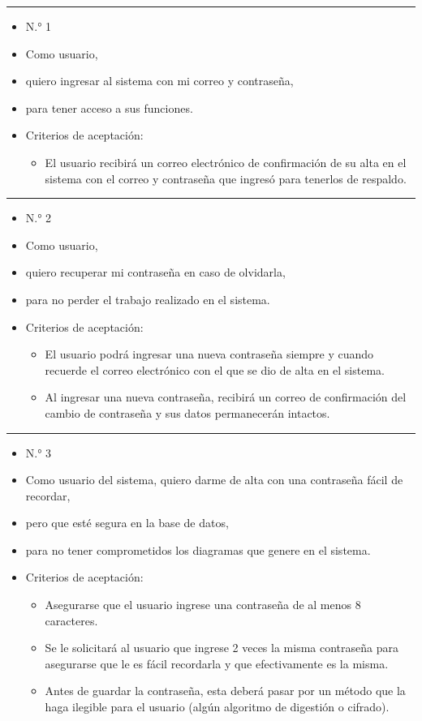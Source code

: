 \noindent\rule{\textwidth}{1pt}
\begin{itemize}
	\item N.° 1
	\item Como usuario,
	\item quiero ingresar al sistema con mi correo y contraseña,
	\item para tener acceso a sus funciones.
	\item Criterios de aceptación:
	\begin{itemize}
		\item El usuario recibirá un correo electrónico de confirmación de su alta en el sistema con el correo y contraseña que ingresó para tenerlos de respaldo.
	\end{itemize}
\end{itemize}
\noindent\rule{\textwidth}{1pt}
\begin{itemize}
	\item N.° 2
	\item Como usuario,
	\item quiero recuperar mi contraseña en caso de olvidarla,
	\item para no perder el trabajo realizado en el sistema.
	\item Criterios de aceptación:
	\begin{itemize}
		\item El usuario podrá ingresar una nueva contraseña siempre y cuando recuerde el correo electrónico con el que se dio de alta en el sistema.
		\item Al ingresar una nueva contraseña, recibirá un correo de confirmación del cambio de contraseña y sus datos permanecerán intactos.
	\end{itemize}
\end{itemize}
\noindent\rule{\textwidth}{1pt}
\begin{itemize}
	\item N.° 3
	\item Como usuario del sistema, quiero darme de alta con una contraseña fácil de recordar,
	\item pero que esté segura en la base de datos,
	\item para no tener comprometidos los diagramas que genere en el sistema.

	\item Criterios de aceptación:
	\begin{itemize}
		\item Asegurarse que el usuario ingrese una contraseña de al menos 8 caracteres.
		\item Se le solicitará al usuario que ingrese 2 veces la misma contraseña para asegurarse que le es fácil recordarla y que efectivamente es la misma.
		\item Antes de guardar la contraseña, esta deberá pasar por un método que la haga ilegible para el usuario (algún algoritmo de digestión o cifrado).
	\end{itemize}
\end{itemize}
